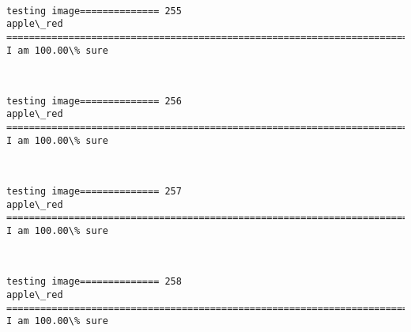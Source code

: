 \documentclass[11pt]{article}
\begin{document}
    \begin{center}
    \end{center}
    { \hspace*{\fill} \\}
    
    \begin{Verbatim}[commandchars=\\\{\}]
testing image============== 255
apple\_red
============================================================================
I am 100.00\% sure

    \end{Verbatim}

    \begin{center}
    \end{center}
    { \hspace*{\fill} \\}
    
    \begin{Verbatim}[commandchars=\\\{\}]
testing image============== 256
apple\_red
============================================================================
I am 100.00\% sure

    \end{Verbatim}

    \begin{center}
    \end{center}
    { \hspace*{\fill} \\}
    
    \begin{Verbatim}[commandchars=\\\{\}]
testing image============== 257
apple\_red
============================================================================
I am 100.00\% sure

    \end{Verbatim}

    \begin{center}
    \end{center}
    { \hspace*{\fill} \\}
    
    \begin{Verbatim}[commandchars=\\\{\}]
testing image============== 258
apple\_red
============================================================================
I am 100.00\% sure

    \end{Verbatim}
\end{document}
